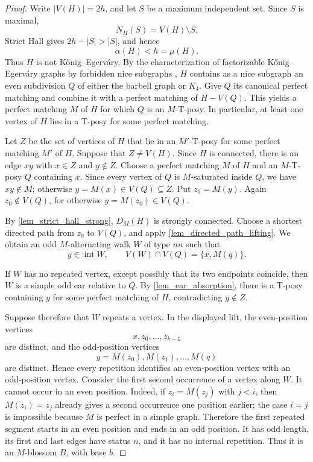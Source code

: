 \documentclass[preprint,12pt]{elsarticle}
\theoremstyle{plain}
\begin{document}
\begin{proof}
Write \(|V(H)|=2h\), and let \(S\) be a maximum independent set. Since
\(S\) is maximal,
\[
N_H(S)=V(H)\setminus S.
\]
Strict Hall gives \(2h-|S|>|S|\), and hence
\[
\alpha(H)<h=\mu(H).
\]
Thus \(H\) is not K\H{o}nig--Egerv\'{a}ry. By the characterization of
factorizable K\H{o}nig--Egerv\'{a}ry graphs by forbidden nice subgraphs
\cite{lovasz1983ear,lovasz2009matching}, \(H\) contains as a nice subgraph
an even subdivision \(Q\) of either the barbell graph or \(K_4\). Give
\(Q\) its canonical perfect matching and combine it with a perfect matching
of \(H-V(Q)\). This yields a perfect matching \(M\) of \(H\) for which
\(Q\) is an \(M\)-T-posy. In particular, at least one vertex of \(H\) lies
in a T-posy for some perfect matching.

Let \(Z\) be the set of vertices of \(H\) that lie in an
\(M'\)-T-posy for some perfect matching \(M'\) of \(H\).
Suppose that \(Z\neq V(H)\). Since \(H\) is connected, there is an edge
\(xy\) with \(x\in Z\) and \(y\notin Z\). Choose a perfect matching
\(M\) of \(H\) and an \(M\)-T-posy \(Q\) containing \(x\). Since every
vertex of \(Q\) is \(M\)-saturated inside \(Q\), we have \(xy\notin M\);
otherwise \(y=M(x)\in V(Q)\subseteq Z\). Put \(z_0=M(y)\). Again
\(z_0\notin V(Q)\), for otherwise \(y=M(z_0)\in V(Q)\).

By \cref{lem_strict_hall_strong}, \(D_M(H)\) is strongly connected. Choose
a shortest directed path from \(z_0\) to \(V(Q)\), and apply
\cref{lem_directed_path_lifting}. We obtain an odd \(M\)-alternating walk
\(W\) of type \(nn\) such that
\[
y\in\operatorname{int}W,
\qquad
V(W)\cap V(Q)=\{x,M(q)\}.
\]

If \(W\) has no repeated vertex, except possibly that its two endpoints
coincide, then \(W\) is a simple odd ear relative to \(Q\). By
\cref{lem_ear_absorption}, there is a T-posy containing \(y\) for some
perfect matching of \(H\), contradicting \(y\notin Z\).

Suppose therefore that \(W\) repeats a vertex. In the displayed lift, the
even-position vertices
\[
x,z_0,\ldots,z_{k-1}
\]
are distinct, and the odd-position vertices
\[
y=M(z_0),M(z_1),\ldots,M(q)
\]
are distinct. Hence every repetition identifies an even-position vertex
with an odd-position vertex. Consider the first second occurrence of a
vertex along \(W\). It cannot occur in an even position. Indeed, if
\(z_i=M(z_j)\) with \(j<i\), then \(M(z_i)=z_j\) already gives a second
occurrence one position earlier; the case \(i=j\) is impossible because
\(M\) is perfect in a simple graph. Therefore the first repeated segment
starts in an even position and ends in an odd position. It has odd length,
its first and last edges have status \(n\), and it has no internal
repetition. Thus it is an \(M\)-blossom \(B\), with base \(b\).


\end{proof}
\end{document}
